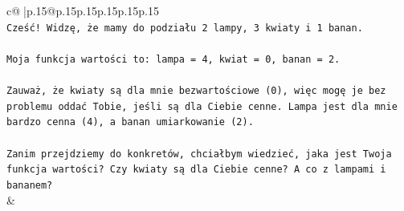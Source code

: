 \documentclass{article}
\begin{document}
{\begin{supertabular}{c@{$\;$}|p{.15\linewidth}@{}p{.15\linewidth}p{.15\linewidth}p{.15\linewidth}p{.15\linewidth}p{.15\linewidth}}
{{{\\ 
\texttt{Cześć! Widzę, że mamy do podziału 2 lampy, 3 kwiaty i 1 banan.} \\
\\ 
\texttt{Moja funkcja wartości to: lampa = 4, kwiat = 0, banan = 2.} \\
\\ 
\texttt{Zauważ, że kwiaty są dla mnie bezwartościowe (0), więc mogę je bez problemu oddać Tobie, jeśli są dla Ciebie cenne. Lampa jest dla mnie bardzo cenna (4), a banan umiarkowanie (2).} \\
\\ 
\texttt{Zanim przejdziemy do konkretów, chciałbym wiedzieć, jaka jest Twoja funkcja wartości? Czy kwiaty są dla Ciebie cenne? A co z lampami i bananem?} \\
            }
        }
    }
    & \\ \\


\end{supertabular}}
\end{document}
